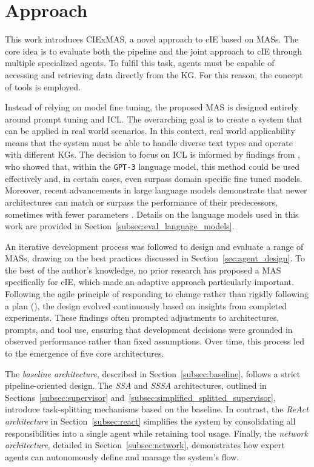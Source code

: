 \documentclass[a4paper,oneside,bibliography=totoc]{scrbook}
\begin{document}
\chapter{Approach}
\label{ch:approach}

This work introduces CIExMAS, a novel approach to \ac{cIE} based on \acp{MAS}. The core idea is to evaluate both the pipeline and the joint approach to \ac{cIE} through multiple specialized agents. To fulfil this task, agents must be capable of accessing and retrieving data directly from the \ac{KG}. For this reason, the concept of tools is employed.

Instead of relying on model fine tuning, the proposed \ac{MAS} is designed entirely around prompt tuning and \ac{ICL}. The overarching goal is to create a system that can be applied in real world scenarios. In this context, real world applicability means that the system must be able to handle diverse text types and operate with different \acp{KG}. The decision to focus on \ac{ICL} is informed by findings from \citet{Brown2020}, who showed that, within the \texttt{GPT-3} language model, this method could be used effectively and, in certain cases, even surpass domain specific fine tuned models. Moreover, recent advancements in large language models demonstrate that newer architectures can match or surpass the performance of their predecessors, sometimes with fewer parameters \cite{MetaAI2025,Chiang2024}. Details on the language models used in this work are provided in Section~\ref{subsec:eval_language_models}.

An iterative development process was followed to design and evaluate a range of \acp{MAS}, drawing on the best practices discussed in Section~\ref{sec:agent_design}. To the best of the author's knowledge, no prior research has proposed a \ac{MAS} specifically for \ac{cIE}, which made an adaptive approach particularly important. Following the agile principle of responding to change rather than rigidly following a plan (\cite{Abrahamsson2017}), the design evolved continuously based on insights from completed experiments. These findings often prompted adjustments to architectures, prompts, and tool use, ensuring that development decisions were grounded in observed performance rather than fixed assumptions. Over time, this process led to the emergence of five core architectures.


The \textit{baseline architecture}, described in Section~\ref{subsec:baseline}, follows a strict pipeline-oriented design. The \textit{\ac{SSA}} and \textit{\ac{SSSA}} architectures, outlined in Sections~\ref{subsec:supervisor} and~\ref{subsec:simplified_splitted_supervisor}, introduce task-splitting mechanisms based on the baseline. In contrast, the \textit{ReAct architecture} in Section~\ref{subsec:react} simplifies the system by consolidating all responsibilities into a single agent while retaining tool usage. Finally, the \textit{network architecture}, detailed in Section~\ref{subsec:network}, demonstrates how expert agents can autonomously define and manage the system's flow.
\end{document}
